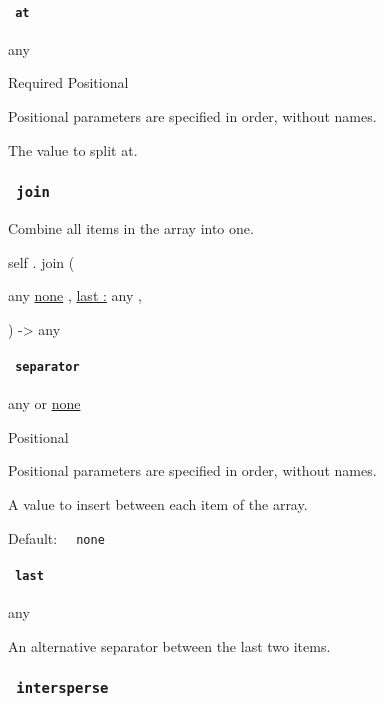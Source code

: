 \paragraph{\texorpdfstring{\texttt{\ at\ }}{ at }}\label{definitions-split-at}

{ any }

{Required} {{ Positional }}

\label{definitions-split-at-positional-tooltip}
Positional parameters are specified in order, without names.

The value to split at.

\subsubsection{\texorpdfstring{\texttt{\ join\ }}{ join }}\label{definitions-join}

Combine all items in the array into one.

self { . } { join } (

{ { any } \href{/docs/reference/foundations/none/}{none} , } {
\hyperref[definitions-join-parameters-last]{last :} { any } , }

) -\textgreater{} { any }

\paragraph{\texorpdfstring{\texttt{\ separator\ }}{ separator }}\label{definitions-join-separator}

{ any } {or} \href{/docs/reference/foundations/none/}{none}

{{ Positional }}

\label{definitions-join-separator-positional-tooltip}
Positional parameters are specified in order, without names.

A value to insert between each item of the array.

Default: \texttt{\ }{\texttt{\ none\ }}\texttt{\ }

\paragraph{\texorpdfstring{\texttt{\ last\ }}{ last }}\label{definitions-join-last}

{ any }

An alternative separator between the last two items.

\subsubsection{\texorpdfstring{\texttt{\ intersperse\ }}{ intersperse }}\label{definitions-intersperse}

